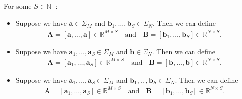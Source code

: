 \begin{definition}
  For some $S \in \mathbb{N}_+$:
  \begin{itemize}
    \item Suppose we have $\mathbf{a} \in \Sigma_M$ and $\mathbf{b}_1, \ldots, \mathbf{b}_S \in \Sigma_N$.
          Then we can define
          \begin{equation*}
            \begin{aligned}
              \mathbf{A} = \left[\mathbf{a}, \ldots, \mathbf{a}\right] \in \mathbb{R}^{M \times S}
              \quad\text{and}\quad
              \mathbf{B} = \left[\mathbf{b}_1, \ldots, \mathbf{b}_S \right] \in \mathbb{R}^{N \times S}.
            \end{aligned}
          \end{equation*}
    \item Suppose we have $\mathbf{a}_1, \ldots, \mathbf{a}_S \in \Sigma_M$ and $\mathbf{b} \in \Sigma_N$.
          Then we can define
          \begin{equation*}
            \begin{aligned}
              \mathbf{A} = \left[\mathbf{a}_1, \ldots, \mathbf{a}_S\right] \in \mathbb{R}^{M \times S}
              \quad\text{and}\quad
              \mathbf{B} = \left[\mathbf{b}, \ldots, \mathbf{b} \right] \in \mathbb{R}^{N \times S}.
            \end{aligned}
          \end{equation*}
    \item Suppose we have $\mathbf{a}_1, \ldots, \mathbf{a}_S \in \Sigma_M$ and $\mathbf{b}_1, \ldots, \mathbf{b}_S \in \Sigma_N$.
          Then we can define
          \begin{equation*}
            \begin{aligned}
              \mathbf{A} = \left[\mathbf{a}_1, \ldots, \mathbf{a}_S\right] \in \mathbb{R}^{M \times S}
              \quad\text{and}\quad
              \mathbf{B} = \left[\mathbf{b}_1, \ldots, \mathbf{b}_S \right] \in \mathbb{R}^{N \times S}.
            \end{aligned}
          \end{equation*}
  \end{itemize}
\end{definition}

